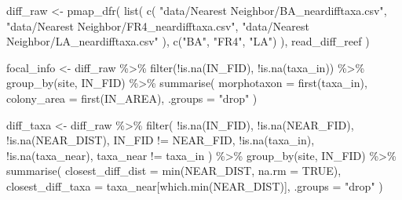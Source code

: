 \documentclass[
  letterpaper,
  DIV=11,
  numbers=noendperiod]{scrartcl}
\newenvironment{Shaded}{\begin{snugshade}}{\end{snugshade}}
\newcommand{\AttributeTok}[1]{\textcolor[rgb]{0.40,0.45,0.13}{#1}}
\newcommand{\ConstantTok}[1]{\textcolor[rgb]{0.56,0.35,0.01}{#1}}
\newcommand{\FunctionTok}[1]{\textcolor[rgb]{0.28,0.35,0.67}{#1}}
\newcommand{\NormalTok}[1]{\textcolor[rgb]{0.00,0.23,0.31}{#1}}
\newcommand{\OtherTok}[1]{\textcolor[rgb]{0.00,0.23,0.31}{#1}}
\newcommand{\SpecialCharTok}[1]{\textcolor[rgb]{0.37,0.37,0.37}{#1}}
\newcommand{\StringTok}[1]{\textcolor[rgb]{0.13,0.47,0.30}{#1}}
\begin{document}
\begin{Shaded}
\begin{Highlighting}[]
\NormalTok{diff\_raw }\OtherTok{\textless{}{-}} \FunctionTok{pmap\_dfr}\NormalTok{(}
  \FunctionTok{list}\NormalTok{(}
    \FunctionTok{c}\NormalTok{(}
      \StringTok{"data/Nearest Neighbor/BA\_neardifftaxa.csv"}\NormalTok{,}
      \StringTok{"data/Nearest Neighbor/FR4\_neardifftaxa.csv"}\NormalTok{,}
      \StringTok{"data/Nearest Neighbor/LA\_neardifftaxa.csv"}
\NormalTok{    ),}
    \FunctionTok{c}\NormalTok{(}\StringTok{"BA"}\NormalTok{, }\StringTok{"FR4"}\NormalTok{, }\StringTok{"LA"}\NormalTok{)}
\NormalTok{  ),}
\NormalTok{  read\_diff\_reef}
\NormalTok{)}

\NormalTok{focal\_info }\OtherTok{\textless{}{-}}\NormalTok{ diff\_raw }\SpecialCharTok{\%\textgreater{}\%}
  \FunctionTok{filter}\NormalTok{(}\SpecialCharTok{!}\FunctionTok{is.na}\NormalTok{(IN\_FID), }\SpecialCharTok{!}\FunctionTok{is.na}\NormalTok{(taxa\_in)) }\SpecialCharTok{\%\textgreater{}\%}
  \FunctionTok{group\_by}\NormalTok{(site, IN\_FID) }\SpecialCharTok{\%\textgreater{}\%}
  \FunctionTok{summarise}\NormalTok{(}
    \AttributeTok{morphotaxon =} \FunctionTok{first}\NormalTok{(taxa\_in),}
    \AttributeTok{colony\_area =} \FunctionTok{first}\NormalTok{(IN\_AREA),}
    \AttributeTok{.groups =} \StringTok{"drop"}
\NormalTok{  )}

\NormalTok{diff\_taxa }\OtherTok{\textless{}{-}}\NormalTok{ diff\_raw }\SpecialCharTok{\%\textgreater{}\%}
  \FunctionTok{filter}\NormalTok{(}
    \SpecialCharTok{!}\FunctionTok{is.na}\NormalTok{(IN\_FID), }\SpecialCharTok{!}\FunctionTok{is.na}\NormalTok{(NEAR\_FID), }\SpecialCharTok{!}\FunctionTok{is.na}\NormalTok{(NEAR\_DIST),}
\NormalTok{    IN\_FID }\SpecialCharTok{!=}\NormalTok{ NEAR\_FID,}
    \SpecialCharTok{!}\FunctionTok{is.na}\NormalTok{(taxa\_in), }\SpecialCharTok{!}\FunctionTok{is.na}\NormalTok{(taxa\_near),}
\NormalTok{    taxa\_near }\SpecialCharTok{!=}\NormalTok{ taxa\_in}
\NormalTok{  ) }\SpecialCharTok{\%\textgreater{}\%}
  \FunctionTok{group\_by}\NormalTok{(site, IN\_FID) }\SpecialCharTok{\%\textgreater{}\%}
  \FunctionTok{summarise}\NormalTok{(}
    \AttributeTok{closest\_diff\_dist =} \FunctionTok{min}\NormalTok{(NEAR\_DIST, }\AttributeTok{na.rm =} \ConstantTok{TRUE}\NormalTok{),}
    \AttributeTok{closest\_diff\_taxa =}\NormalTok{ taxa\_near[}\FunctionTok{which.min}\NormalTok{(NEAR\_DIST)],}
    \AttributeTok{.groups =} \StringTok{"drop"}
\NormalTok{  )}


\end{Highlighting}
\end{Shaded}
\end{document}
